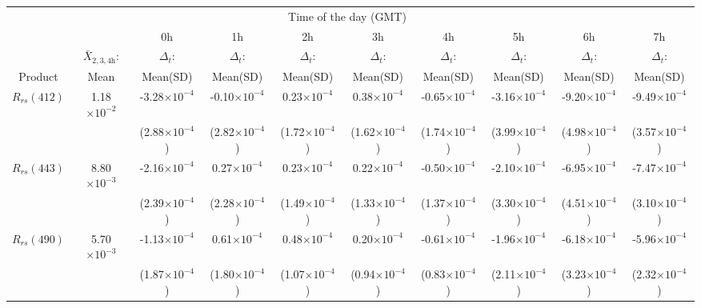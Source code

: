 \documentclass[preview]{standalone}
\begin{document}
\begin{threeparttable}
\scriptsize
\centering
\setlength\tabcolsep{1.5pt} %
\begin{tabular}{cccccccccc} \hline
   &   \multicolumn{8}{c}{Time of the day (GMT)}    \\ \cline{3-10}
& &    0h    & 1h  &  2h  &  3h  &  4h  &  5h  &  6h   &  7h   \\ 
   & $\bar{X}_{2,3,4\text{h}}$: &  $\Delta_t$:    & $\Delta_t$:  &  $\Delta_t$:  &  $\Delta_t$:  &  $\Delta_t$:  &  $\Delta_t$:  &  $\Delta_t$:   &  $\Delta_t$:  \\ 
Product & Mean\tnote{*}  &     Mean(SD)\tnote{*}    & Mean(SD)\tnote{*}  &  Mean(SD)\tnote{*}  &  Mean(SD)\tnote{*}  &  Mean(SD)\tnote{*}  &  Mean(SD)\tnote{*}  &  Mean(SD)\tnote{*}   &  Mean(SD)\tnote{*}  \\ \hline \hline 
$R_{rs}(412)$ & 1.18$\times10^{-2}$	& -3.28$\times10^{-4}$ 	&   -0.10$\times10^{-4}$	&    0.23$\times10^{-4}$ 	&    0.38$\times10^{-4}$ 	&   -0.65$\times10^{-4}$ 	&   -3.16$\times10^{-4}$ 	&   -9.20$\times10^{-4}$ 	&   -9.49$\times10^{-4}$ \\
			  &						& (2.88$\times10^{-4}$) & (2.82$\times10^{-4}$) 	& (1.72$\times10^{-4}$) 	& (1.62$\times10^{-4}$) 	& (1.74$\times10^{-4}$) 	& (3.99$\times10^{-4}$) 	& (4.98$\times10^{-4}$) 	& (3.57$\times10^{-4}$) \\ \hline
$R_{rs}(443)$ & 8.80$\times10^{-3}$	& -2.16$\times10^{-4}$ 	&    0.27$\times10^{-4}$ 	&    0.23$\times10^{-4}$ 	&    0.22$\times10^{-4}$ 	&   -0.50$\times10^{-4}$ 	&   -2.10$\times10^{-4}$ 	&   -6.95$\times10^{-4}$ 	&   -7.47$\times10^{-4}$ \\
			  &						& (2.39$\times10^{-4}$) & (2.28$\times10^{-4}$) 	& (1.49$\times10^{-4}$) 	& (1.33$\times10^{-4}$) 	& (1.37$\times10^{-4}$) 	& (3.30$\times10^{-4}$) 	& (4.51$\times10^{-4}$) 	& (3.10$\times10^{-4}$) \\ \hline
$R_{rs}(490)$ & 5.70$\times10^{-3}$	& -1.13$\times10^{-4}$ 	&    0.61$\times10^{-4}$ 	&    0.48$\times10^{-4}$ 	&    0.20$\times10^{-4}$ 	&   -0.61$\times10^{-4}$ 	&   -1.96$\times10^{-4}$ 	&   -6.18$\times10^{-4}$ 	&   -5.96$\times10^{-4}$ \\
			  &						& (1.87$\times10^{-4}$) & (1.80$\times10^{-4}$) 	& (1.07$\times10^{-4}$) 	& (0.94$\times10^{-4}$) 	& (0.83$\times10^{-4}$) 	& (2.11$\times10^{-4}$) 	& (3.23$\times10^{-4}$) 	& (2.32$\times10^{-4}$) \\ \hline

\end{tabular}
\end{threeparttable}
\end{document}

